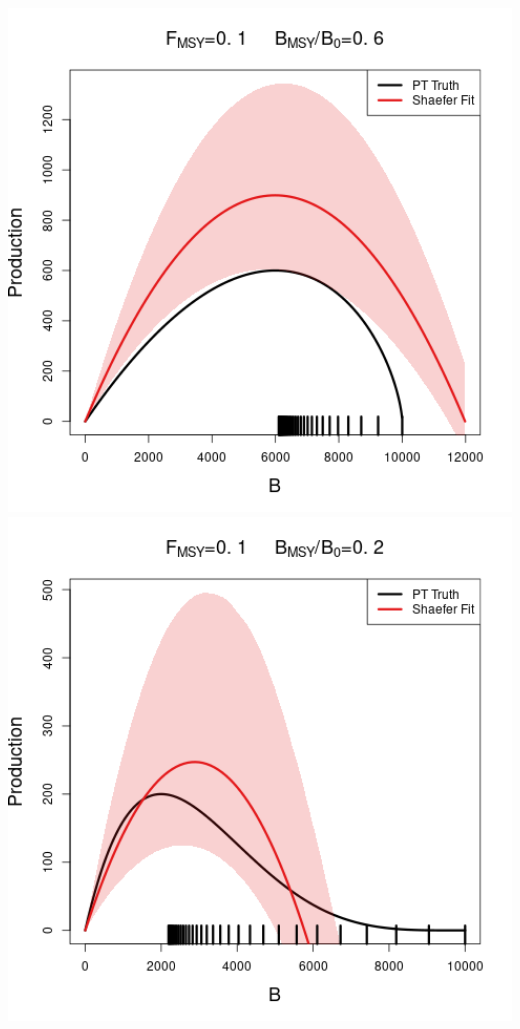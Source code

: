 \documentclass[ xcolor = pdftex, dvipsnames, table ]{beamer}
\begin{document}
\begin{frame}
\begin{minipage}[h!]{0.325\textwidth}
\includegraphics[width=1.1\textwidth]{../../.././nick/gpBias/curveCompareFlatNoQX0.5Z0.6.png}\\
\includegraphics[width=1.1\textwidth]{../../.././nick/gpBias/curveCompareFlatNoQX0.5Z0.2.png}

\end{minipage}
\end{frame}
\end{document}
